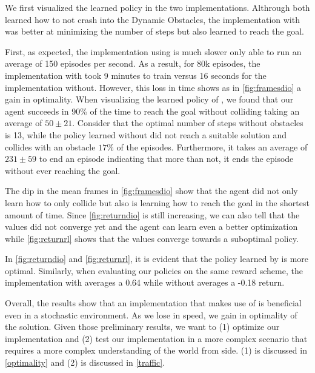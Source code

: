     We first visualized the learned policy in the two implementations. Althrough both learned 
    how to not crash into the Dynamic Obstacles, the implementation with \dio{} was better at minimizing the number of steps 
    but also learned to reach the goal. 

    First, as expected, the implementation using \dio{} is much slower only able to run 
    an average of 150 episodes per second. As a result, for 80k episodes, the implementation with \dio{} 
    took 9 minutes to train versus 16 seconds for the implementation without. However, this loss in time shows as in \ref{fig:framesdio} 
    a gain in optimality. When visualizing the learned policy of \dio{}, we found that our agent succeeds in 90\% 
    of the time to reach the goal without colliding taking an average of $50 \pm 21$. Consider that 
    the optimal number of steps without obstacles is 13, while the policy learned without \dio{} did not reach a suitable solution and collides with an obstacle $17\%$ of the episodes. Furthermore, it takes an average of $231 \pm 59$ to end an episode 
    indicating that more than not, it ends the episode without ever
    reaching the goal. 


    The dip in the mean frames in \ref{fig:framesdio} show that the agent did not only learn 
    how to only collide but also is learning how to reach the goal in the shortest amount of time. 
    Since \ref{fig:returndio} is still increasing, we can also tell that the values did not converge yet and 
    the agent can learn even a better optimization while \ref{fig:returnrl} shows that the values converge towards
    a suboptimal policy.


    In \ref{fig:returndio} and \ref{fig:returnrl}, it is evident that the policy learned by \dio{} 
    is more optimal. Similarly, when evaluating our policies on the same reward scheme, 
    the implementation with \dio{} averages a 0.64 while without \dio{} averages a -0.18 return.

    Overall, the results show that an implementation that makes use of
    \dio{} is beneficial even in a stochastic environment. As we lose in speed, we gain in optimality of the solution. 
    Given those preliminary results, we want to (1) optimize our implementation 
    and (2) test our implementation in a more complex scenario that requires a more complex understanding of the world 
    from \dio{} side. (1) is discussed in \ref{optimality} and (2) is discussed in \ref{traffic}. 

    
